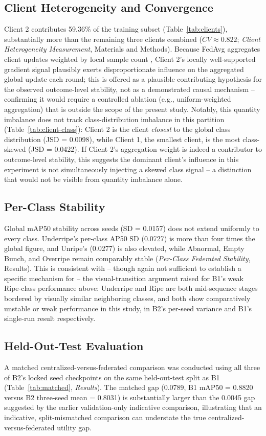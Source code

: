 \documentclass[11pt]{article}
\begin{document}
\subsection*{Client Heterogeneity and Convergence}
Client 2 contributes 59.36\% of the training subset (Table~\ref{tab:clients}), substantially more than the remaining three clients combined ($CV \approx 0.822$; \emph{Client Heterogeneity Measurement}, Materials and Methods). Because FedAvg aggregates client updates weighted by local sample count \cite{mcmahan2017fedavg}, Client 2's locally well-supported gradient signal plausibly exerts disproportionate influence on the aggregated global update each round; this is offered as a plausible contributing hypothesis for the observed outcome-level stability, not as a demonstrated causal mechanism -- confirming it would require a controlled ablation (e.g., uniform-weighted aggregation) that is outside the scope of the present study. Notably, this quantity imbalance does not track class-distribution imbalance in this partition (Table~\ref{tab:client-class}): Client 2 is the client \emph{closest} to the global class distribution (JSD = 0.0098), while Client 1, the smallest client, is the most class-skewed (JSD = 0.0422). If Client 2's aggregation weight is indeed a contributor to outcome-level stability, this suggests the dominant client's influence in this experiment is not simultaneously injecting a skewed class signal -- a distinction that would not be visible from quantity imbalance alone.

\subsection*{Per-Class Stability}
Global mAP50 stability across seeds (SD = 0.0157) does not extend uniformly to every class. Underripe's per-class AP50 SD (0.0727) is more than four times the global figure, and Unripe's (0.0277) is also elevated, while Abnormal, Empty Bunch, and Overripe remain comparably stable (\emph{Per-Class Federated Stability}, Results). This is consistent with -- though again not sufficient to establish a specific mechanism for -- the visual-transition argument raised for B1's weak Ripe-class performance above: Underripe and Ripe are both mid-sequence stages bordered by visually similar neighboring classes, and both show comparatively unstable or weak performance in this study, in B2's per-seed variance and B1's single-run result respectively.

\subsection*{Held-Out-Test Evaluation}
A matched centralized-versus-federated comparison was conducted using all three of B2's locked seed checkpoints on the same held-out-test split as B1 (Table~\ref{tab:matched}, \emph{Results}). The matched gap (0.0789, B1 mAP50 = 0.8820 versus B2 three-seed mean = 0.8031) is substantially larger than the 0.0045 gap suggested by the earlier validation-only indicative comparison, illustrating that an indicative, split-mismatched comparison can understate the true centralized-versus-federated utility gap.
\end{document}
